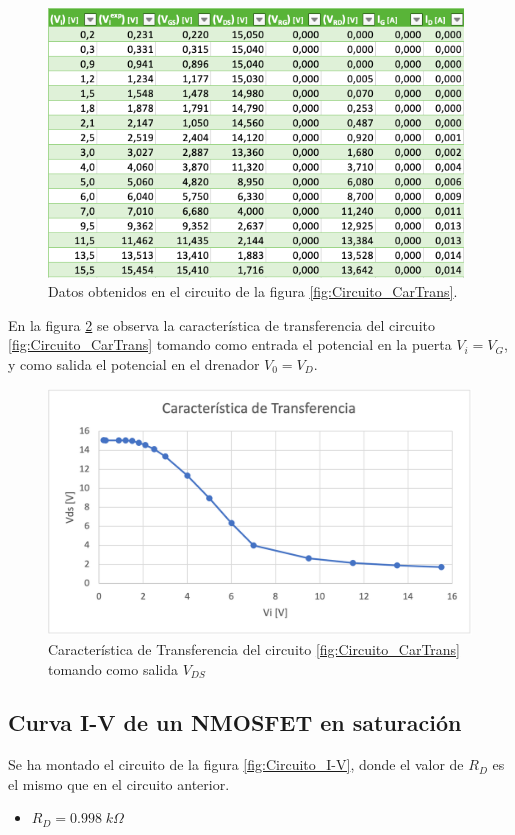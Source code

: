 \begin{figure}
    \centering
    \includegraphics[width=11cm]{Imágenes 05/Tabla_Datos_CarTrans.png}
    \caption{Datos obtenidos en el circuito de la figura \ref{fig:Circuito_CarTrans}.}
    \label{fig:Datos_CarTrans}
\end{figure}

En la figura \ref{fig:CarTrans_Exp} se observa la característica de transferencia del circuito \ref{fig:Circuito_CarTrans} tomando como entrada el potencial en la puerta $V_i = V_G$, y como salida el potencial en el drenador $V_0 = V_D $.

\begin{figure}
    \centering
    \includegraphics[width=13cm]{Imágenes 05/CarTrans_Exp.png}
    \caption{Característica de Transferencia del circuito \ref{fig:Circuito_CarTrans} tomando como salida $V_{DS}$}
    \label{fig:CarTrans_Exp}
\end{figure}

\newpage
\subsection{Curva I-V de un NMOSFET en saturación}
Se ha montado el circuito de la figura \ref{fig:Circuito_I-V}, donde el valor de $R_D$ es el mismo que en el circuito anterior.
\begin{itemize}
    \item $R_D = 0.998\;k\Omega$
\end{itemize}


